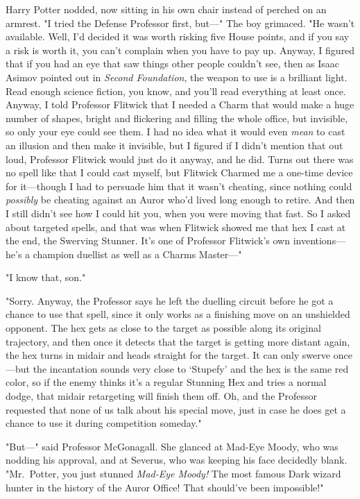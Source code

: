 Harry Potter nodded, now sitting in his own chair instead of perched on an
armrest. "I tried the Defense Professor first, but—" The boy grimaced.
"He{\el} wasn't available. Well, I'd decided it was worth risking five House
points, and if you say a risk is worth it, you can't complain when you have to
pay up. Anyway, I figured that if you had an eye that saw things other people
couldn't see, then as Isaac Asimov pointed out in \emph{Second Foundation}, the
weapon to use is a brilliant light. Read enough science fiction, you know, and
you'll read everything at least once. Anyway, I told Professor Flitwick that I
needed a Charm that would make a huge number of shapes, bright and flickering
and filling the whole office, but invisible, so only your eye could see them. I
had no idea what it would even \emph{mean} to cast an illusion and then make it
invisible, but I figured if I didn't mention that out loud, Professor Flitwick
would just do it anyway, and he did. Turns out there was no spell like that I
could cast myself, but Flitwick Charmed me a one-time device for it—though I
had to persuade him that it wasn't cheating, since nothing could
\emph{possibly} be cheating against an Auror who'd lived long enough to retire.
And then I still didn't see how I could hit you, when you were moving that
fast. So I asked about targeted spells, and that was when Flitwick showed me
that hex I cast at the end, the Swerving Stunner. It's one of Professor
Flitwick's own inventions—he's a champion duellist as well as a Charms
Master—"

"I know that, son."

"Sorry. Anyway, the Professor says he left the duelling circuit before he got a
chance to use that spell, since it only works as a finishing move on an
unshielded opponent. The hex gets as close to the target as possible along its
original trajectory, and then once it detects that the target is getting more
distant again, the hex turns in midair and heads straight for the target. It
can only swerve once—but the incantation sounds very close to `Stupefy' and
the hex is the same red color, so if the enemy thinks it's a regular Stunning
Hex and tries a normal dodge, that midair retargeting will finish them off. Oh,
and the Professor requested that none of us talk about his special move, just
in case he does get a chance to use it during competition someday."

"But—" said Professor McGonagall. She glanced at Mad-Eye Moody, who was
nodding his approval, and at Severus, who was keeping his face decidedly blank.
"Mr.~Potter, you just stunned \emph{Mad-Eye Moody!}  The most famous Dark
wizard hunter in the history of the Auror Office! That should've been
impossible!"

